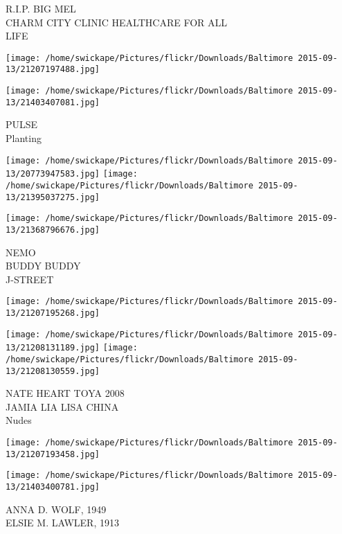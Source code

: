 \documentclass[10pt,letterpaper]{article}
\begin{document}
R.I.P. BIG MEL\\
CHARM CITY CLINIC HEALTHCARE FOR ALL\\
LIFE\\
\pagebreak

\texttt{[image: /home/swickape/Pictures/flickr/Downloads/Baltimore 2015-09-13/21207197488.jpg]}

\vspace{0.25in}
\texttt{[image: /home/swickape/Pictures/flickr/Downloads/Baltimore 2015-09-13/21403407081.jpg]}

PULSE\\
Planting\\
\pagebreak

\texttt{[image: /home/swickape/Pictures/flickr/Downloads/Baltimore 2015-09-13/20773947583.jpg]}
\texttt{[image: /home/swickape/Pictures/flickr/Downloads/Baltimore 2015-09-13/21395037275.jpg]}

\texttt{[image: /home/swickape/Pictures/flickr/Downloads/Baltimore 2015-09-13/21368796676.jpg]}

NEMO\\
BUDDY BUDDY\\
J{-}STREET\\
\pagebreak

\texttt{[image: /home/swickape/Pictures/flickr/Downloads/Baltimore 2015-09-13/21207195268.jpg]}

\vspace{0.25in}
\texttt{[image: /home/swickape/Pictures/flickr/Downloads/Baltimore 2015-09-13/21208131189.jpg]}
\texttt{[image: /home/swickape/Pictures/flickr/Downloads/Baltimore 2015-09-13/21208130559.jpg]}

NATE HEART TOYA 2008\\
JAMIA LIA LISA CHINA\\
Nudes\\
\pagebreak

\texttt{[image: /home/swickape/Pictures/flickr/Downloads/Baltimore 2015-09-13/21207193458.jpg]}

\vspace{0.25in}
\texttt{[image: /home/swickape/Pictures/flickr/Downloads/Baltimore 2015-09-13/21403400781.jpg]}

ANNA D. WOLF, 1949\\
ELSIE M. LAWLER, 1913\\
\pagebreak
\end{document}

